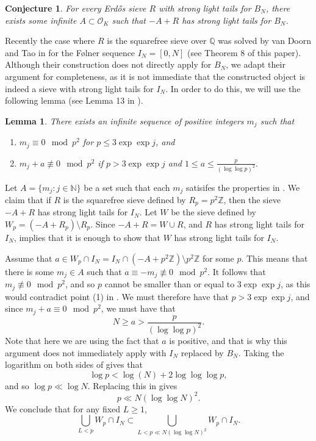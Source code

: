 \documentclass[a4paper,11pt,reqno]{amsart}
\theoremstyle{plain}
\newtheorem{lemma}[theorem]{Lemma}
\newtheorem{conjecture}[theorem]{Conjecture}
\theoremstyle{remark}
\newcommand{\q}{\mathbb{Q}}
\newcommand{\z}{\mathbb{Z}}
\newcommand{\co}{\mathcal{O}}
\begin{document}
				\begin{conjecture}
					\label{cnj: the only one}
					For every Erdős sieve  $R$ with strong light tails for $B_N$, there exists some infinite $A \subset \co_K$ such that $-A+R$ has strong light tails for $B_N$.
				\end{conjecture}
				
				Recently the case where $R$ is the squarefree sieve over $\q$ was solved by van Doorn and Tao in \cite{van Doorn} for the Følner sequence $I_N  = [0,N]$ (see Theorem 8 of this paper). Although their construction does not directly apply for $B_N$, we adapt their argument for completeness, as it is not immediate that the constructed object is indeed a sieve with strong light tails for $I_N$. In order to do this, we will use the following lemma (see Lemma 13 in  \cite{van Doorn}). 
				
				\begin{lemma}
					\label{lm:taovandoorn}
					There exists an infinite sequence of positive integers $m_j$ such that 
					\begin{enumerate}
						\item $m_j \equiv 0 \mod p^2$ for $p \leq 3\exp\exp j$, and
						\item $m_j+a \not \equiv 0 \mod p^2$ if $p> 3 \exp \exp j$ and $1 \leq a \leq \frac{p}{(\log\log p)^2}.$
					\end{enumerate}
				\end{lemma}
				
				Let $A = \{m_j:j \in \mathbb{N}\}$ be a set such that each $m_j$ satisifes the properties in . We claim that if $R$ is the squarefree sieve defined by $R_p = p^2\z$, then the sieve $-A+R$ has strong light tails for $I_N$. Let $W$ be the sieve defined by $W_p = (-A+R_p)\setminus R_p$. Since $-A+R = W \cup R$, and $R$ has strong light tails for $I_N$,  implies that it is enough to show that $W$ has strong light tails for $I_N$.
				
				Assume that $a \in W_p \cap I_N = I_N\cap (-A+p^2\z)\setminus p^2\z$ for some $p$. This means that there is some $m_j \in A$ such that $a \equiv -m_j \not \equiv 0 \mod p^2$. It follows that $m_j \not \equiv 0 \mod p^2$, and so $p$ cannot be smaller than or equal to $3 \exp\exp j$, as this would contradict point (1) in . We must therefore have that $p > 3 \exp \exp j$, and since $m_j+a \equiv 0 \mod p^2$, we must have that \begin{equation}
					\label{eq:TaoDoorn1}
					N \geq a > \frac{p}{(\log\log p)^2}.
				\end{equation} Note that here we are using the fact that $a$ is positive, and that is why this argument does not immediately apply with $I_N$ replaced by $B_N$. Taking the logarithm on both sides of  gives that $$\log p < \log(N) + 2 \log \log \log p,$$ and so $\log p \ll \log N$. Replacing this in  gives $$p \ll N(\log \log N)^2.$$ We conclude that for any fixed $L \geq 1$,  $$\bigcup_{L <p} W_p \cap I_N \subset \bigcup_{L <p \ll N(\log \log N)^2 } W_p \cap I_N. $$
				
\end{document}
